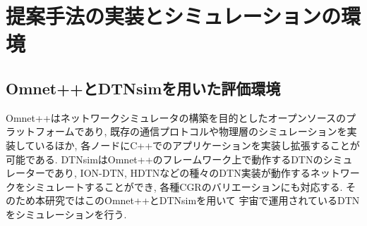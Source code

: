 \chapter{提案手法の実装とシミュレーションの環境}
\label{chap:implementation_and_experimentation}

\section{Omnet++とDTNsimを用いた評価環境}
Omnet++はネットワークシミュレータの構築を目的としたオープンソースのプラットフォームであり, 
既存の通信プロトコルや物理層のシミュレーションを実装しているほか, 
各ノードにC++でのアプリケーションを実装し拡張することが可能である. 
DTNsimはOmnet++のフレームワーク上で動作するDTNのシミュレーターであり, 
ION-DTN, HDTNなどの種々のDTN実装が動作するネットワークをシミュレートすることができ, 
各種CGRのバリエーションにも対応する. そのため本研究ではこのOmnet++とDTNsimを用いて
宇宙で運用されているDTNをシミュレーションを行う. 


